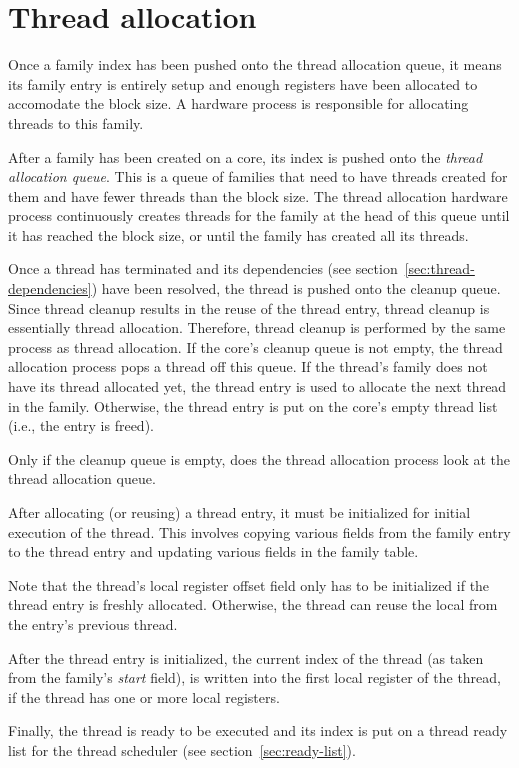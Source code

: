 \section{\label{sec:thread-alloc}Thread allocation}

Once a family index has been pushed onto the thread allocation queue, it means its family entry is entirely setup and enough registers have been allocated to accomodate the block size. A hardware process is responsible for allocating threads to this family.

After a family has been created on a core, its index is pushed onto the \emph{thread allocation queue}. This is a queue of families that need to have threads created for them and have fewer threads than the block size. The thread allocation hardware process continuously creates threads for the family at the head of this queue until it has reached the block size, or until the family has created all its threads.

Once a thread has terminated and its dependencies (see section~\ref{sec:thread-dependencies}) have been resolved, the thread is pushed onto the cleanup queue. Since thread cleanup results in the reuse of the thread entry, thread cleanup is essentially thread allocation. Therefore, thread cleanup is performed by the same process as thread allocation. If the core's cleanup queue is not empty, the thread allocation process pops a thread off this queue. If the thread's family does not have its thread allocated yet, the thread entry is used to allocate the next thread in the family. Otherwise, the thread entry is put on the core's empty thread list (i.e., the entry is freed).

Only if the cleanup queue is empty, does the thread allocation process look at the thread allocation queue.

After allocating (or reusing) a thread entry, it must be initialized for initial execution of the thread. This involves copying various fields from the family entry to the thread entry and updating various fields in the family table.

Note that the thread's local register offset field only has to be initialized if the thread entry is freshly allocated. Otherwise, the thread can reuse the local from the entry's previous thread.

After the thread entry is initialized, the current index of the thread (as taken from the family's \emph{start} field), is written into the first local register of the thread, if the thread has one or more local registers.

Finally, the thread is ready to be executed and its index is put on a thread ready list for the thread scheduler (see section~\ref{sec:ready-list}).